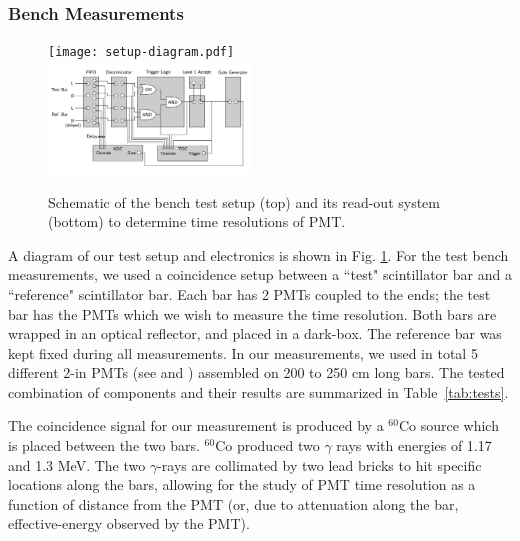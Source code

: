 \documentclass[3p,final,twocolumn]{elsarticle}
\begin{document}
\subsubsection{Bench Measurements}
\begin{figure}[th!]
	\centering
		\texttt{[image: setup-diagram.pdf]} \\
		\includegraphics[width=0.48\textwidth]{electr_setup.png}
	\caption{Schematic of the bench test setup (top) and its read-out system (bottom) to determine time resolutions of PMT. }
	\label{fig:test_stand_setup}
\end{figure}

A diagram of our test setup and electronics is shown in Fig. \ref{fig:test_stand_setup}. For the test bench measurements, we used a coincidence setup between a ``test" scintillator bar and a ``reference" scintillator bar. Each bar has 2 PMTs 
coupled to the ends; the test bar has the PMTs which we wish to measure the time resolution. Both bars are wrapped in an optical reflector, and placed in a dark-box. The reference bar was kept fixed during all measurements. In our measurements, we used in total 5 different 2-in PMTs (see \cite{hamapmts} and \cite{pmt9214}) assembled on 200 to 250 \si{\centi\meter} long bars. The tested combination of components and their results are summarized in Table~\ref{tab:tests}.  

The coincidence signal for our measurement is produced by a $^{60}$Co source which is placed between the two bars. $^{60}$Co produced  
two $\gamma$ rays with energies of 1.17 and 1.3 \si{\mega\electronvolt}. The two $\gamma$-rays are collimated by two lead bricks to hit specific locations along the bars, allowing for the 
study of PMT time resolution as a function of distance from the PMT (or, due to attenuation along the bar, effective-energy observed by the PMT).
\end{document}
